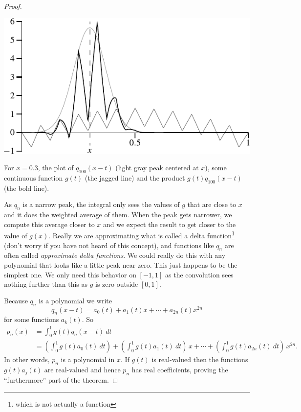 \begin{proof}
\begin{myfigureht}
\includegraphics{figures/approxdeltaconv}
\caption{For $x=0.3$, the plot of $q_{100}(x-t)$ (light gray peak centered
at $x$), some continuous function
$g(t)$ (the jagged line) and the product $g(t)q_{100}(x-t)$ (the bold line).\label{fig:approxdeltaconv}}
\end{myfigureht}

As $q_n$ is a narrow peak, the integral
only sees the values of $g$ that are
close to $x$ and it does the weighted average of them.
When the peak gets narrower, we compute this average closer to $x$
and we expect the result to get closer to the value of $g(x)$.  Really we are
approximating what is called a delta function\footnote{which is not actually
a function} (don't worry if you have not
heard of this concept),
and functions like $q_n$ are often called
\emph{approximate delta functions}.
We could really do this with any polynomial that looks like a little peak
near zero.  This just happens to be the simplest one.
We only need this behavior on $[-1,1]$ as the convolution sees nothing
further than this as $g$ is zero outside $[0,1]$.

Because $q_n$ is a polynomial we write
\begin{equation*}
q_n(x-t) = a_0(t) + a_1(t)x + \cdots + a_{2n}(t) x^{2n}
\end{equation*}
for some functions $a_k(t)$.
So
\begin{equation*}
\begin{split}
p_n(x) & =
\int_{0}^1 g(t)q_n(x-t) ~dt
\\
&=
\left(
\int_0^1
g(t)
a_0(t)~dt
\right)
+
\left(
\int_0^1
g(t)
a_1(t)~dt
\right)
\,
x
+
\cdots
+
\left(
\int_0^1
g(t)
a_{2n}(t)~dt
\right)
\,
x^{2n} .
\end{split}
\end{equation*}
In other words, $p_n$ is a polynomial in $x$.
If $g(t)$ is real-valued then the functions $g(t)a_j(t)$ are
real-valued and hence $p_n$ has real coefficients,
proving the ``furthermore'' part of the theorem.


\end{proof}
